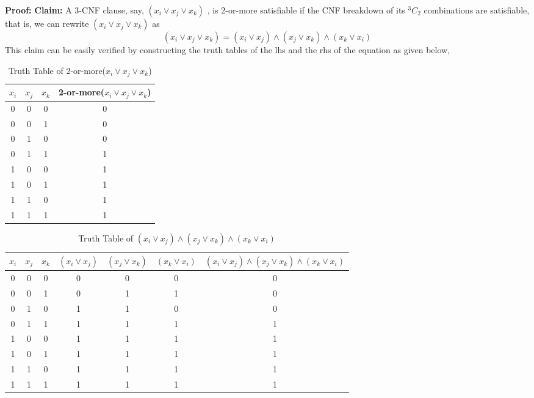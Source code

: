 \documentclass{article}
\begin{document}
\textbf{Proof:} \newline
\textbf{Claim:} A 3-CNF clause, say, $(x_{i} \vee x_{j} \vee x_{k})$ , is 2-or-more satisfiable if the CNF breakdown of its $^3C_{2}$ combinations are satisfiable, that is, we can rewrite $(x_{i} \vee x_{j} \vee x_{k})$ as \newline
\begin{equation}
	(x_{i} \vee x_{j} \vee x_{k}) = (x_{i} \vee x_{j}) \wedge (x_{j} \vee x_{k}) \wedge (x_{k} \vee x_{i})
\end{equation}
This claim can be easily verified by constructing the truth tables of the lhs and the rhs of the equation as given below, \newline
\begin{table}[ht]
  \caption{Truth Table of 2-or-more($x_{i} \vee x_{j} \vee x_{k}$)}
  \centering
  \begin{tabular}{c c c c}
  \hline\hline
   $x_{i}$ & $x_{j}$ & $x_{k}$ & 2-or-more($x_{i} \vee x_{j} \vee x_{k}$) \\[0.5ex]
  \hline
  0 & 0 & 0 & 0 \\
  0 & 0 & 1 & 0 \\
  0 & 1 & 0 & 0 \\
  0 & 1 & 1 & 1 \\
  1 & 0 & 0 & 1 \\
  1 & 0 & 1 & 1 \\
  1 & 1 & 0 & 1 \\
  1 & 1 & 1 & 1 \\
  \end{tabular}
  \label{table:nonlin}
  \end{table}	  

\begin{table}[ht]
  \caption{Truth Table of $(x_{i} \vee x_{j}) \wedge (x_{j} \vee x_{k}) \wedge (x_{k} \vee x_{i})$}
  \centering
  \begin{tabular}{c c c c c c c}
  \hline\hline
  $x_{i}$ &  $x_{j}$ & $x_{k}$ & $(x_{i} \vee x_{j})$ & $(x_{j} \vee x_{k})$ & $(x_{k} \vee x_{i})$ & $(x_{i} \vee x_{j}) \wedge (x_{j} \vee x_{k}) \wedge (x_{k} \vee x_{i})$  \\[0.5ex]
  \hline
  0 & 0 & 0 & 0 & 0 & 0 & 0 \\
  0 & 0 & 1 & 0 & 1 & 1 & 0 \\
  0 & 1 & 0 & 1 & 1 & 0 & 0 \\
  0 & 1 & 1 & 1 & 1 & 1 & 1 \\
  1 & 0 & 0 & 1 & 1 & 1 & 1 \\
  1 & 0 & 1 & 1 & 1 & 1 & 1 \\
  1 & 1 & 0 & 1 & 1 & 1 & 1 \\
  1 & 1 & 1 & 1 & 1 & 1 & 1 \\ [0.5ex]
  \end{tabular}
  \label{table:nonlin}
  \end{table}
\end{document}
